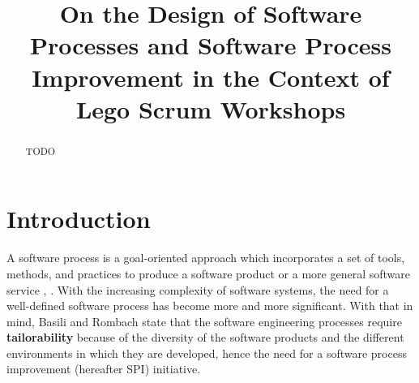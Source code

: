 \documentclass[conference]{IEEEtran}
\begin{document}
\title{On the Design of Software Processes and Software Process Improvement in
the Context of Lego Scrum Workshops}

\author{
}

\maketitle

\begin{abstract}

TODO
\end{abstract}

\section{Introduction}


A software process is a goal-oriented approach which incorporates a set of
tools, methods, and practices to produce a software product or a more general
software service \cite{Munch2012}, \cite{Humphrey1989}.
With the increasing complexity of software systems, the need for a well-defined
software process has become more and more significant.
With that in mind, Basili and Rombach \cite{Basili1988} state that the software
engineering processes require \textbf{tailorability} because of the diversity
of the software products and the different environments in which they are
developed, hence the need for a software process improvement (hereafter SPI)
initiative.
\end{document}
